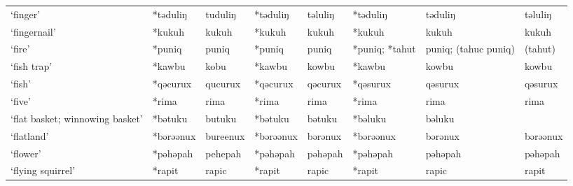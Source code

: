 \begin{landscape}
\begin{longtable}[c]{@{}p{3cm}<{\raggedright}p{2.75cm}<{\raggedright}p{2.75cm}<{\raggedright}p{2.75cm}<{\raggedright}p{2.75cm}<{\raggedright}p{2.75cm}<{\raggedright}p{2.75cm}<{\raggedright}p{2.75cm}<{\raggedright}@{}}
`finger'                                             & *təduliŋ     & tuduliŋ                       & *təduliŋ       & təluliŋ                    & *təduliŋ         & təduliŋ                  & təluliŋ                           \\
`fingernail'                                         & *kukuh       & kukuh                         & *kukuh         & kukuh                      & *kukuh           & kukuh                    & kukuh                             \\
`fire'                                               & *puniq       & puniq                         & *puniq         & puniq                      & *puniq; *tahut   & puniq; (tahuc puniq)     & (tahut)                           \\
`fish trap'                                          & *kawbu       & kobu                          & *kawbu         & kowbu                      & *kawbu           & kowbu                    & kowbu                             \\
`fish'                                               & *qəcurux     & qucurux                       & *qəcurux       & qəcurux                    & *qəsurux         & qəsurux                  & qəsurux                           \\
`five'                                               & *rima        & rima                          & *rima          & rima                       & *rima            & rima                     & rima                              \\
`flat basket; winnowing basket'                      & *bətuku      & butuku                        & *bətuku        & bətuku                     & *bəluku          & bəluku                   &                                   \\
`flatland'                                           & *bərəənux    & bureenux                      & *bərəənux      & bərənux                    & *bərəənux        & bərənux                  & bərəənux                          \\
`flower'                                             & *pəhəpah     & pehepah                       & *pəhəpah       & pəhəpah                    & *pəhəpah         & pəhəpah                  & pəhəpah                           \\
`flying squirrel'                                    & *rapit       & rapic                         & *rapit         & rapic                      & *rapit           & rapic                    & rapit                             \\

\end{longtable}
\end{landscape}
